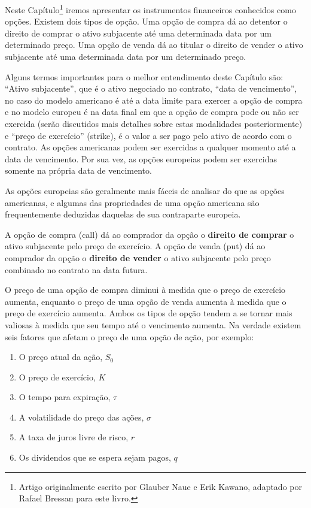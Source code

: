 \documentclass[]{book}
\providecommand{\tightlist}{%
  \setlength{\itemsep}{0pt}\setlength{\parskip}{0pt}}
\let\rmarkdownfootnote\footnote%
\def\footnote{\protect\rmarkdownfootnote}
\begin{document}
Neste Capítulo\footnote{Artigo originalmente escrito por Glauber Naue e
  Erik Kawano, adaptado por Rafael Bressan para este livro.} iremos
apresentar os instrumentos financeiros conhecidos como opções. Existem
dois tipos de opção. Uma opção de compra dá ao detentor o direito de
comprar o ativo subjacente até uma determinada data por um determinado
preço. Uma opção de venda dá ao titular o direito de vender o ativo
subjacente até uma determinada data por um determinado preço.

Alguns termos importantes para o melhor entendimento deste Capítulo são:
``Ativo subjacente'', que é o ativo negociado no contrato, ``data de
vencimento'', no caso do modelo americano é até a data limite para
exercer a opção de compra e no modelo europeu é na data final em que a
opção de compra pode ou não ser exercida (serão discutidos mais detalhes
sobre estas modalidades posteriormente) e ``preço de exercício''
(strike), é o valor a ser pago pelo ativo de acordo com o contrato. As
opções americanas podem ser exercidas a qualquer momento até a data de
vencimento. Por sua vez, as opções europeias podem ser exercidas somente
na própria data de vencimento.

As opções europeias são geralmente mais fáceis de analisar do que as
opções americanas, e algumas das propriedades de uma opção americana são
frequentemente deduzidas daquelas de sua contraparte europeia.

A opção de compra (call) dá ao comprador da opção o \textbf{direito de
comprar} o ativo subjacente pelo preço de exercício. A opção de venda
(put) dá ao comprador da opção o \textbf{direito de vender} o ativo
subjacente pelo preço combinado no contrato na data futura.

O preço de uma opção de compra diminui à medida que o preço de exercício
aumenta, enquanto o preço de uma opção de venda aumenta à medida que o
preço de exercício aumenta. Ambos os tipos de opção tendem a se tornar
mais valiosas à medida que seu tempo até o vencimento aumenta. Na
verdade existem seis fatores que afetam o preço de uma opção de ação,
por exemplo:

\begin{enumerate}
\def\labelenumi{\arabic{enumi}.}
\tightlist
\item
  O preço atual da ação, \(S_0\)
\item
  O preço de exercício, \(K\)
\item
  O tempo para expiração, \(\tau\)
\item
  A volatilidade do preço das ações, \(\sigma\)
\item
  A taxa de juros livre de risco, \(r\)
\item
  Os dividendos que se espera sejam pagos, \(q\)
\end{enumerate}
\end{document}
